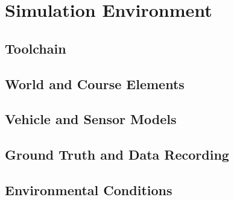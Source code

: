\chapter{Simulation Environment}
\label{chap:simulation-environment}

\section{Toolchain}
\label{sec:simulation-environment-toolchain}

\section{World and Course Elements}
\label{sec:simulation-environment-world}

\section{Vehicle and Sensor Models}
\label{sec:simulation-environment-vehicle-sensors}

\section{Ground Truth and Data Recording}
\label{sec:simulation-environment-ground-truth}

\section{Environmental Conditions}
\label{sec:simulation-environment-conditions}
